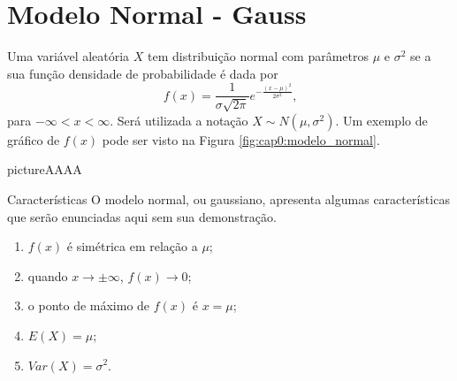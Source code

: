 \documentclass[11pt,fleqn]{book}
\numberwithin{mpicture}{chapter}
\numberwithin{mtable}{chapter}
\numberwithin{mframe}{chapter}
\begin{document}
\iffalse
\begin{exerciseInsideArea}
	\item Uma industria fabrica lâmpadas especiais que ficam em operação continuamente. A empresa oferece a seus clientes a garantia de reposição, caso a lâmpada dure menos de 50 horas. A vida útil dessas lâmpadas é modelada através da distribuição exponencial com parâmetro $\dfrac{1}{8.000}$. Determine
	
		\begin{enumerate}[label=(\alph*)]
			\item a porcentagem de trocas por defeito de fabricação;
			\item a duração média das lâmpadas;
			\item se a indústria fabrica 1.000 lâmpadas por semana, quantas dessas ela espera repor por semana;
			\item qual deve ser a garantia para que a indústria reponha no máximo 1\% de sua produção.
		\end{enumerate}
\end{exerciseInsideArea}
\fi

\section{Modelo Normal - Gauss}

Uma variável aleatória $X$ tem distribuição normal com parâmetros $\mu$ e $\sigma^2$ se a sua função densidade de probabilidade é dada por
\[
	f(x)=\frac{1}{\sigma\sqrt{2\pi}}e^{-\frac{(x-\mu)^2}{2\sigma^2}}
	\text{,}
\]
para $-\infty < x < \infty$. Será utilizada a notação $X\sim N(\mu,\sigma^2)$. Um exemplo de gráfico de $f(x)$ pode ser visto na Figura \ref{fig:cap0:modelo_normal}.

\begin{sidepicture}{2cm}{picture}{AAAA}
	\label{fig:cap0:modelo_normal}
\end{sidepicture}

\begin{note}{Características}
	O modelo normal, ou gaussiano, apresenta algumas características que serão enunciadas aqui sem sua demonstração.
	
	\begin{enumerate}[label=(\alph*)]
		\item $f(x)$ é simétrica em relação a $\mu$;
		\item quando $x\to\pm\infty$, $f(x)\to 0$;
		\item o ponto de máximo de $f(x)$ é $x=\mu$;
		\item $E(X)=\mu$;
		\item $Var(X)=\sigma^2$.
	\end{enumerate}
\end{note}
\end{document}
